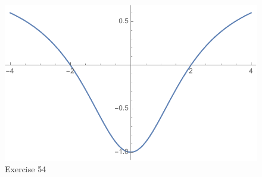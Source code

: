 \documentclass[letterpaper, landscape]{exam}
\begin{document}
\begin{description}
\begin{solution}
        \begin{figure}[H]
          \centering
          \includegraphics[scale = 0.6]{ex41_54.pdf}
        \caption{Exercise 54}
        \label{fig:ex41_54}
        \end{figure}
      \end{solution}

  \end{description}
  
\end{document}
